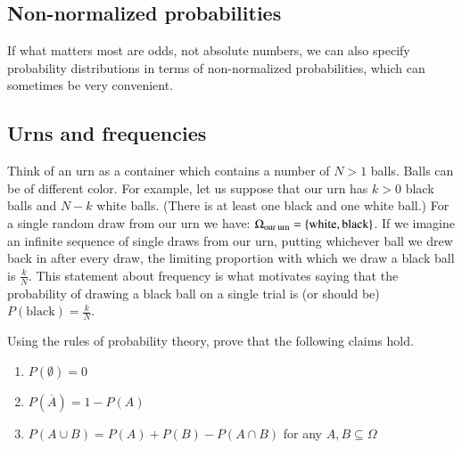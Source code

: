 \documentclass[nobib,nofonts]{tufte-handout}
\begin{document}
\subsection{Non-normalized probabilities}

If what matters most are odds, not absolute numbers, we can also specify probability distributions in terms of non-normalized probabilities, which can sometimes be very convenient.


\subsection{Urns and frequencies}
\label{sec:urns-frequencies}

Think of an urn as a container which contains a number of $N > 1$ balls. Balls can be of
different color. For example, let us suppose that our urn has $k > 0$ black balls and $N-k$
white balls. (There is at least one black and one white ball.) For a single random draw from
our urn we have: $\Omega_{\text{our urn}} = \left\{\text{white}, \text{black}\right\}$. If we imagine an
infinite sequence of single draws from our urn, putting whichever ball we drew back in after
every draw, the limiting proportion with which we draw a black ball is
$\frac{k}{N}$. This
statement about frequency is what motivates saying that the probability of drawing a black ball
on a single trial is (or should be)
$P(\text{black}) = \frac{k}{N}$.

\bigskip
\noindent \colorbox{mygray}{\centering
  \begin{minipage}{1.0\textwidth}

    \begin{exercise}
      Using the rules of probability theory, prove that the following claims hold.
      \begin{enumerate}[{C}1.]
        \item $P(\emptyset) = 0$
        \item $P(\overline{A}) = 1 - P(A)$
        \item $P(A \cup B) = P(A) + P(B) - P(A \cap B)$ for any $A, B \subseteq \Omega$
      \end{enumerate}
    \end{exercise}
  \end{minipage}
}
\end{document}
